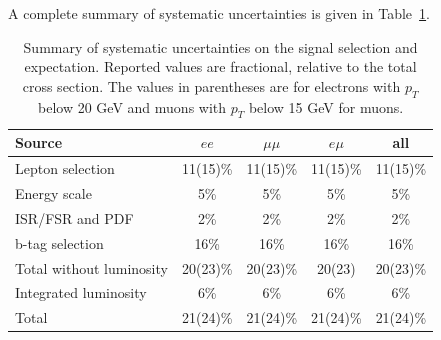 A complete summary of systematic uncertainties is given in Table~\ref{tab:systSumm}.

\begin{table}[h]
\begin{center}
\caption{\small\label{tab:systSumm}Summary of systematic uncertainties on the signal selection and
expectation. Reported values are fractional, relative to the total cross section. The values in parentheses are for electrons 
with $p_T$ below 20 GeV and muons with $p_T$ below 15 GeV for muons.}
\begin{tabular}{lcccc}\hline
Source 					& $ee$		& $\mu\mu$		& $e\mu$	& all \\ \hline
Lepton selection			& 11(15)\%	& 11(15)\%		& 11(15)\%	& 11(15)\% \\
Energy scale				& 5\%		& 5\%			& 5\%		& 5\% \\
ISR/FSR and PDF				& 2\%		& 2\%			& 2\%		& 2\% 	\\
b-tag selection                         & 16\%          & 16\%                  & 16\%          & 16\% \\
Total without luminosity		& 20(23)\%	& 20(23)\%		& 20(23)	& 20(23)\%\\ \hline
Integrated luminosity			& 6\%		& 6\%			& 6\%		& 6\%	\\ \hline
Total 					& 21(24)\% 	& 21(24)\% 		& 21(24)\% 	& 21(24)\% \\
\hline
\end{tabular}
\end{center}
\end{table}
